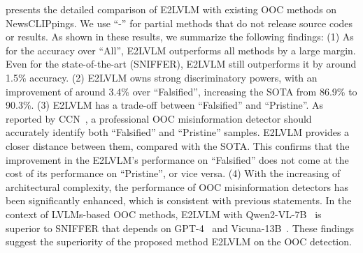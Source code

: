  presents the detailed comparison of E2LVLM with existing OOC methods on NewsCLIPpings. We use ``-'' for partial methods that do not release source codes or results. As shown in these results, we summarize the following findings: (1) As for the accuracy over ``All'', E2LVLM outperforms all methods by a large margin. Even for the state-of-the-art (SNIFFER), E2LVLM still outperforms it by around 1.5\% accuracy. (2) E2LVLM owns strong discriminatory powers, with an improvement of around 3.4\% over ``Falsified'', increasing the SOTA from 86.9\% to 90.3\%. (3) E2LVLM has a trade-off between ``Falsified'' and ``Pristine''. As reported by CCN~\cite{abdelnabi2022open}, a professional OOC misinformation detector should accurately identify both ``Falsified'' and ``Pristine'' samples. E2LVLM provides a closer distance between them, compared with the SOTA. This confirms that the improvement in the E2LVLM's performance on ``Falsified'' does not come at the cost of its performance on ``Pristine'', or vice versa. (4) With the increasing of architectural complexity, the performance of OOC misinformation detectors has been significantly enhanced, which is consistent with previous statements. In the context of LVLMs-based OOC methods, E2LVLM with Qwen2-VL-7B~\cite{wang2024qwen2} is superior to SNIFFER that depends on GPT-4~\cite{achiam2023gpt} and Vicuna-13B~\cite{vicuna2023}. These findings suggest the superiority of the proposed method E2LVLM on the OOC detection.


